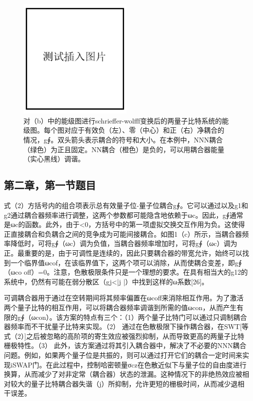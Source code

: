 \documentclass[11pt,twocolumn]{ctexart}
\begin{document}
\begin{figure}[h]
\begin{center}
\includegraphics[width=0.5\textwidth]{fig3.png}
\end{center}
\caption{对（b）中的能级图进行schrieffer-wolfff变换后的两量子比特系统的能级图。每个图对应于有效负（左）、零（中心）和正（右）净耦合的情况，g∮。双头箭头表示耦合的符号和大小。在本例中，NNN耦合（绿色）为正且固定。NN耦合（橙色）是负的，可以用耦合器能量（实心黑线）调谐。}
\label{FIG.3}
\end{figure}



\subsection{第二章，第一节题目}
式（2）方括号内的组合项表示总有效量子位-量子位耦合g∮。它可以通过以及g1和g2通过耦合器频率进行调整，这两个参数都可能隐含地依赖于ωc。因此，g∮通常是ωc的函数。此外，由于<0，方括号中的第一项虚拟交换交互作用为负。这使得正直接耦合和负耦合之间的竞争成为可能间接耦合。如图1（c）所示，当耦合器频率降低时，可将g∮（ωc）调为负值，当耦合器频率增加时，可将g∮（ωc）调为正。最重要的是，由于可调性是连续的，因此只要耦合器的带宽允许，始终可以找到一个临界值ωcof，在该临界值下，这两个项可以消除，从而使耦合变差，即g∮（ωco off）=0。注意，色散极限条件只是一个理想的要求。在具有相当大的g12的系统中，仍然有可能在弱分散区（gj<|j |）中找到这样的ω系数[26]。

可调耦合器用于通过在空转期间将其频率偏置在ωcoff来消除相互作用。为了激活两个量子比特的相互作用，可以将耦合器频率调谐到所需的值ωcon，从而产生有限的g∮（ωcon）。该方案的特点有三个：（1）两个量子比特门可以通过只调制耦合器频率而不干扰量子比特来实现。（2） 通过在色散极限下操作耦合器，在SWT[等式（2）]之后被忽略的高阶项的寄生效应被强烈抑制，从而导致更高的两量子比特栅极特性。（3） 此外，该方案通过将其引入耦合器中，解决了不必要的NNN耦合问题。例如，如果两个量子位是共振的，则可以通过打开它们的耦合一定时间来实现iSWAP门。在此过程中，控制哈密顿量σcz在色散近似下与量子位的自由度进行换算，从而减少了对非定常（耦合器）状态的泄漏。这种情况下的非绝热效应被相对较大的量子比特耦合器失谐（j）所抑制，允许更短的栅极时间，从而减少退相干误差。
\end{document}
